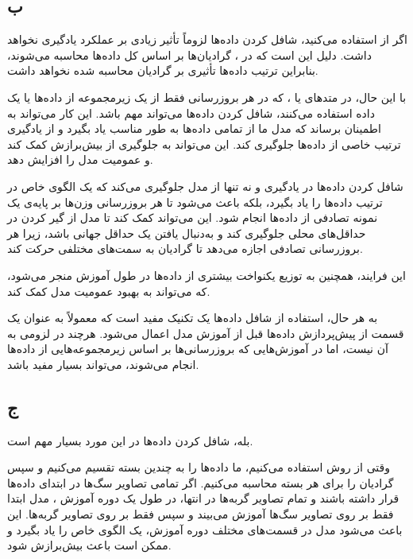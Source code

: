 \subsection*{ب}

اگر از
استفاده می‌کنید، شافل کردن داده‌ها لزوماً تأثیر زیادی بر عملکرد یادگیری نخواهد داشت. دلیل این است که در
، گرادیان‌ها بر اساس کل داده‌ها محاسبه می‌شوند، بنابراین ترتیب داده‌ها تأثیری بر گرادیان محاسبه شده نخواهد داشت.

با این حال، در متد‌های
یا
، که در هر بروزرسانی فقط از یک زیرمجموعه از داده‌ها یا یک داده استفاده می‌کنند، شافل کردن داده‌ها می‌تواند مهم باشد. این کار می‌تواند به اطمینان برساند که مدل ما از تمامی داده‌ها به طور مناسب یاد بگیرد و از یادگیری ترتیب خاصی از داده‌ها جلوگیری کند. این می‌تواند به جلوگیری از بیش‌برازش کمک کند و عمومیت مدل را افزایش دهد.

شافل کردن داده‌ها در یادگیری
و
نه تنها از مدل جلوگیری می‌کند که یک الگوی خاص در ترتیب داده‌ها را یاد بگیرد، بلکه باعث می‌شود تا هر بروزرسانی وزن‌ها بر پایه‌ی یک نمونه تصادفی از داده‌ها انجام شود. این می‌تواند کمک کند تا مدل از گیر کردن در حداقل‌های محلی جلوگیری کند و به‌دنبال یافتن یک حداقل جهانی باشد، زیرا هر بروزرسانی تصادفی اجازه می‌دهد تا گرادیان به سمت‌های مختلفی حرکت کند.

این فرایند، همچنین به توزیع یکنواخت بیشتری از داده‌ها در طول آموزش منجر می‌شود، که می‌تواند به بهبود عمومیت مدل کمک کند.

به هر حال، استفاده از شافل داده‌ها یک تکنیک مفید است که معمولاً به عنوان یک قسمت از پیش‌پردازش داده‌ها قبل از آموزش مدل اعمال می‌شود. هرچند در
لزومی به آن نیست، اما در آموزش‌هایی که بروزرسانی‌ها بر اساس زیرمجموعه‌هایی از داده‌ها انجام می‌شوند، می‌تواند بسیار مفید باشد.

\subsection*{ج}

بله، شافل کردن داده‌ها در این مورد بسیار مهم است.

وقتی از روش
استفاده می‌کنیم، ما داده‌ها را به چندین بسته
تقسیم می‌کنیم و سپس گرادیان را برای هر بسته محاسبه می‌کنیم. اگر تمامی تصاویر سگ‌ها در ابتدای داده‌ها قرار داشته باشند و تمام تصاویر گربه‌ها در انتها، در طول یک دوره آموزش
، مدل ابتدا فقط بر روی تصاویر سگ‌ها آموزش می‌بیند و سپس فقط بر روی تصاویر گربه‌ها. این باعث می‌شود مدل در قسمت‌های مختلف دوره آموزش، یک الگوی خاص را یاد بگیرد و ممکن است باعث بیش‌برازش
شود.

